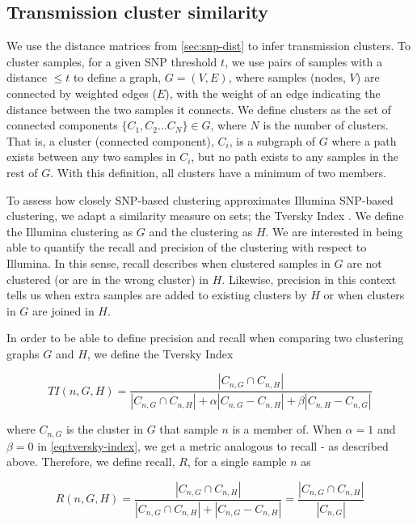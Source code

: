 \subsection{Transmission cluster similarity}
\label{sec:cluster-similarity}

We use the distance matrices from \autoref{sec:snp-dist} to infer transmission clusters. To cluster samples, for a given SNP threshold $t$, we use pairs of samples with a distance $\le t$ to define a graph, $G=(V,E)$, where samples (nodes, $V$) are connected by weighted edges ($E$), with the weight of an edge indicating the distance between the two samples it connects. We define clusters as the set of connected components $\{C_1, C_2...C_N\}\in G$, where $N$ is the number of clusters. That is, a cluster (connected component), $C_i$, is a subgraph of $G$ where a path exists between any two samples in $C_i$, but no path exists to any samples in the rest of $G$. With this definition, all clusters have a minimum of two members. 

To assess how closely \ont{} SNP-based clustering approximates Illumina SNP-based clustering, we adapt a similarity measure on sets; the Tversky Index \cite{tversky1977}. We define the Illumina clustering as $G$ and the \ont{} clustering as $H$. We are interested in being able to quantify the recall and precision of the \ont{} clustering with respect to Illumina. In this sense, recall describes when clustered samples in $G$ are not clustered (or are in the wrong cluster) in $H$. Likewise, precision in this context tells us when extra samples are added to existing clusters by $H$ or when clusters in $G$ are joined in $H$. 

In order to be able to define precision and recall when comparing two clustering graphs $G$ and $H$, we define the Tversky Index

\begin{equation}
\label{eq:tversky-index}
   TI(n, G, H)=\frac{\left|C_{n,G}\cap C_{n,H}\right|}{\left|C_{n,G}\cap C_{n,H}\right|+\alpha |C_{n,G}-C_{n,H}|+\beta |C_{n,H}-C_{n,G}|}
\end{equation}

where $C_{n,G}$ is the cluster in $G$ that sample $n$ is a member of. When $\alpha = 1$ and $\beta=0$ in \autoref{eq:tversky-index}, we get a metric analogous to recall - as described above. Therefore, we define recall, $R$, for a single sample $n$ as

\begin{equation}
\label{eq:recall}
   R(n, G, H)=\frac{\left|C_{n,G}\cap C_{n,H}\right|}{\left|C_{n,G}\cap C_{n,H}\right|+|C_{n,G}-C_{n,H}|}=\frac{\left|C_{n,G}\cap C_{n,H}\right|}{|C_{n,G}|}
\end{equation}

